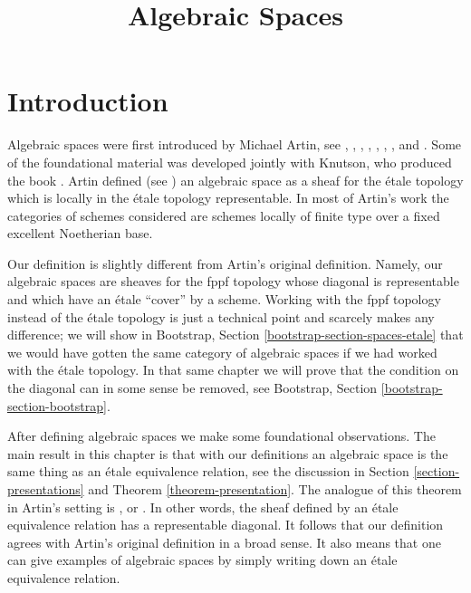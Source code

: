 \documentclass{stacks-project}
\theoremstyle{plain}
\theoremstyle{definition}
\theoremstyle{remark}
\numberwithin{equation}{subsection}
\begin{document}
\title{Algebraic Spaces}


\maketitle

\label{section-phantom}

\tableofcontents

\section{Introduction}
\label{section-introduction}

\noindent
Algebraic spaces were first introduced by Michael Artin,
see \cite{ArtinI}, \cite{ArtinII},
\cite{Artin-Theorem-Representability},
\cite{Artin-Construction-Techniques},
\cite{Artin-Algebraic-Spaces},
\cite{Artin-Algebraic-Approximation},
\cite{Artin-Implicit-Function},
and \cite{ArtinVersal}.
Some of the foundational material was developed jointly with
Knutson, who produced the book \cite{Kn}.
Artin defined (see \cite[Definition 1.3]{Artin-Implicit-Function})
an algebraic space as a sheaf for the \'etale topology
which is locally in the \'etale topology representable.
In most of Artin's work the categories of schemes
considered are schemes locally of finite type over a fixed
excellent Noetherian base.

\medskip\noindent
Our definition is slightly different from Artin's original definition.
Namely, our algebraic spaces are sheaves for the fppf topology
whose diagonal is representable and which have an \'etale ``cover''
by a scheme. Working with the fppf topology instead of the \'etale
topology is just a technical point and scarcely makes
any difference; we will show in
Bootstrap, Section \ref{bootstrap-section-spaces-etale}
that we would have gotten the same category of algebraic spaces
if we had worked with the \'etale topology. In that same chapter
we will prove that the condition on the diagonal
can in some sense be removed, see
Bootstrap, Section \ref{bootstrap-section-bootstrap}.

\medskip\noindent
After defining algebraic spaces we make some foundational observations.
The main result in this chapter is that with our definitions
an algebraic space is the same thing as an \'etale equivalence relation,
see the discussion in Section \ref{section-presentations} and
Theorem \ref{theorem-presentation}. The analogue of this theorem in
Artin's setting is \cite[Theorem 1.5]{Artin-Implicit-Function}, or
\cite[Proposition II.1.7]{Kn}. In other words, the sheaf
defined by an \'etale equivalence relation has a representable diagonal.
It follows that our definition agrees with Artin's original definition
in a broad sense. It also means that one can give examples of algebraic
spaces by simply writing down an \'etale equivalence relation.
\end{document}
